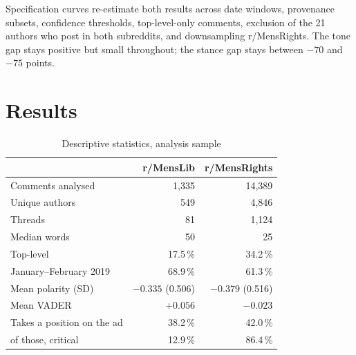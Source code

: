 \documentclass[11pt,a4paper]{article}
\begin{document}
Specification curves re-estimate both results across date windows, provenance subsets, confidence
thresholds, top-level-only comments, exclusion of the 21 authors who post in both subreddits, and
downsampling r/MensRights. The tone gap stays positive but small throughout; the stance gap stays
between $-70$ and $-75$ points.

\section{Results}

\begin{table}[h]
\centering\small
\caption{Descriptive statistics, analysis sample}
\begin{tabular}{lrr}
\toprule
& r/MensLib & r/MensRights \\
\midrule
Comments analysed            & 1{,}335 & 14{,}389 \\
Unique authors               & 549     & 4{,}846 \\
Threads                      & 81      & 1{,}124 \\
Median words                 & 50      & 25 \\
Top-level                    & 17.5\,\% & 34.2\,\% \\
January--February 2019       & 68.9\,\% & 61.3\,\% \\
Mean polarity (SD)           & $-0.335$ (0.506) & $-0.379$ (0.516) \\
Mean VADER                   & $+0.056$ & $-0.023$ \\
Takes a position on the ad   & 38.2\,\% & 42.0\,\% \\
\quad of those, critical     & 12.9\,\% & 86.4\,\% \\
\bottomrule
\end{tabular}
\end{table}
\end{document}
